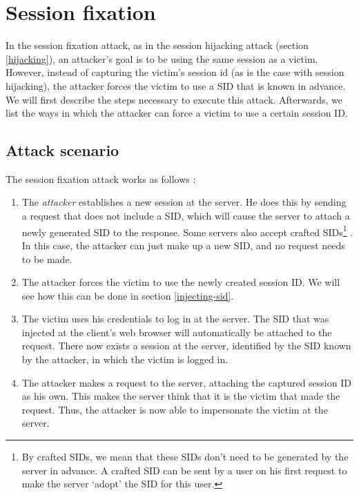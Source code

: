 \section{Session fixation}\label{fixation}

In the session fixation attack, as in the \gls{session hijacking} attack (section \ref{hijacking}), an attacker's goal is to be using the same session as a victim. However, instead of capturing the victim's \gls{session id} (as is the case with session hijacking), the attacker forces the victim to use a SID that is known in advance. We will first describe the steps necessary to execute this attack. Afterwards, we list the ways in which the attacker can force a victim to use a certain session ID.

\subsection{Attack scenario}

The session fixation attack works as follows \cite{Kolsek2002}:

\begin{enumerate}
	\item The \emph{attacker} establishes a new session at the server. He does this by sending a request that does not include a SID, which will cause the server to attach a newly generated
SID to the response. Some servers also accept crafted SIDs\footnote{By crafted SIDs, we mean that these SIDs don't need to be generated by the server in advance. A crafted SID can be sent by a user on his first request to make the server `adopt' the SID for this user.} \cite{Shiflett2004}. In this case, the attacker can just make up a new SID, and no request needs to be made.
	\item The attacker forces the victim to use the newly created session ID. We will see how this can be done in section \ref{injecting-sid}.
	\item The victim uses his credentials to log in at the server. The SID that was injected at the client's web browser will automatically be attached to the request. There now exists a session at the server, identified by the SID known by the attacker, in which the victim is logged in.
	\item The attacker makes a request to the server, attaching the captured session ID as his own. This makes the server think that it is the victim that made the request. Thus, the attacker is now able to impersonate the victim at the server.
\end{enumerate}

